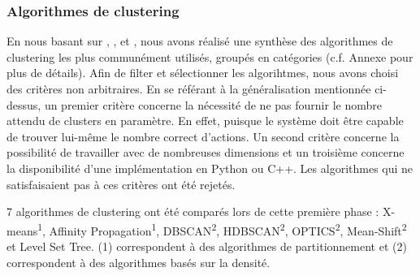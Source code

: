 \documentclass{llncs}
\begin{document}
%

\subsubsection{Algorithmes de clustering}

En nous basant sur \cite{Xu2015}, \cite{Andreopoulos2009}, \cite{Fahad2014} et \cite{Sajana2016}, nous avons réalisé une synthèse des algorithmes de clustering les plus communément utilisés, groupés en catégories (c.f. Annexe pour plus de détails). Afin de filter et sélectionner les algorihtmes, nous avons choisi des critères non arbitraires. En se référant à la généralisation mentionnée ci-dessus, un premier critère concerne la nécessité de ne pas fournir le nombre attendu de clusters en paramètre. En effet, puisque le système doit être capable de trouver lui-même le nombre correct d'actions. Un second critère concerne la possibilité de travailler avec de nombreuses dimensions et un troisième concerne la disponibilité d'une implémentation en Python ou C++. Les algorithmes qui ne satisfaisaient pas à ces critères ont été rejetés.

7 algorithmes de clustering ont été comparés lors de cette première phase : X-means\textsuperscript{1}, Affinity Propagation\textsuperscript{1}, DBSCAN\textsuperscript{2}, HDBSCAN\textsuperscript{2}, OPTICS\textsuperscript{2}, Mean-Shift\textsuperscript{2} et Level Set Tree. (1) correspondent à des algorithmes de partitionnement et (2) correspondent à des algorithmes basés sur la densité.

\end{document}
